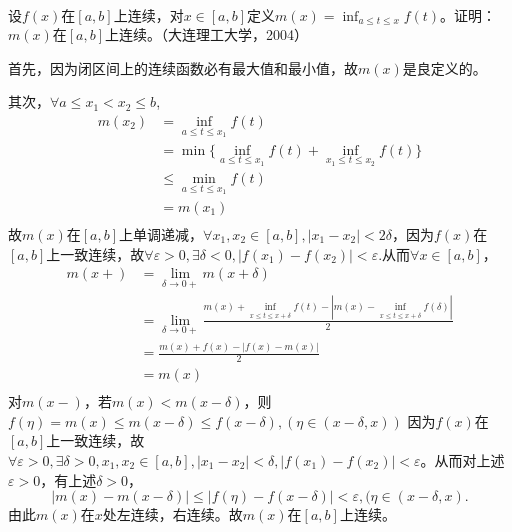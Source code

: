 \begin{example}
\hfill\\
  设$f(x)$在$[a,b]$上连续，对$x\in[a,b]$定义$\displaystyle m(x)=\inf_{a\leq t\leq x}f(t)$。证明：$m(x)$在$[a,b]$上连续。（大连理工大学，2004）
  
  
  首先，因为闭区间上的连续函数必有最大值和最小值，故$m(x)$是良定义的。
  
  其次，$\forall a\leq x_1<x_2\leq b$,
  \[
  \begin{aligned}
  m(x_2)&=\inf_{a\leq t\leq x_1}f(t)\\
  &=\min\{\inf_{a\leq t\leq x_1}f(t)+\inf_{x_1\leq t\leq x_2}f(t)\}\\
  &\leq\min_{a\leq t\leq x_1}f(t)\\
  &=m(x_1)\\
  \end{aligned}
  \]
  故$m(x)$在$[a,b]$上单调递减，$\forall x_1,x_2\in[a,b],|x_1-x_2|<2\delta$，因为$f(x)$在$[a,b]$上一致连续，故$\forall\varepsilon>0,\exists\delta<0,|f(x_1)-f(x_2)|<\varepsilon.$从而$\forall x\in[a,b]$，
  \[
  \begin{aligned}
  m(x+)&=\lim_{\delta\rightarrow0+}m(x+\delta)\\
  &=\lim_{\delta\rightarrow0+}\frac{m(x)+\inf_{x\leq t\leq x+\delta}f(t)-|m(x)-\inf_{x\leq t\leq x+\delta}f(\delta)|}{2}\\
  &=\frac{m(x)+f(x)-|f(x)-m(x)|}{2}\\
  &=m(x)\\
  \end{aligned}
  \]
  对$m(x-)$，若$m(x)<m(x-\delta)$，则$f(\eta)=m(x)\leq m(x-\delta)\leq f(x-\delta),(\eta\in(x-\delta,x))$
  因为$f(x)$在$[a,b]$上一致连续，故$\forall\varepsilon>0,\exists\delta>0,x_1,x_2\in[a,b],|x_1-x_2|<\delta,|f(x_1)-f(x_2)|<\varepsilon$。从而对上述$\varepsilon>0$，有上述$\delta>0$，$$|m(x)-m(x-\delta)|\leq|f(\eta)-f(x-\delta)|<\varepsilon,(\eta\in(x-\delta,x).$$
  由此$m(x)$在$x$处左连续，右连续。故$m(x)$在$[a,b]$上连续。
  \end{example}
  
